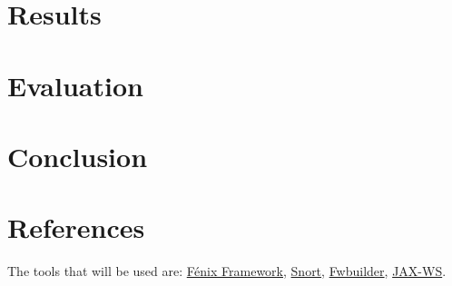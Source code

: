 \documentclass[12pt,paper=a4]{article}
\begin{document}
\section{Results}

\section{Evaluation}
\section{Conclusion}
\section{References}
The tools that will be used are: \href{https://fenix-framework.github.io/}{Fénix Framework}, \href{https://www.snort.org/}{Snort}, \href{http://www.fwbuilder.org/}{Fwbuilder}, \href{https://jax-ws.java.net/}{JAX-WS}.
\end{document}
